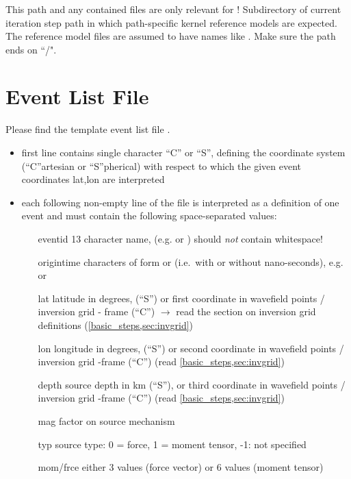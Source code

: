 \subsubsection{} 
This path and any contained files are only relevant for !
Subdirectory of current iteration step path
 in which path-specific kernel reference models are expected.
The reference model files are assumed to have names like .
Make sure the path ends on ``/".

%
\section{Event List File} \label{files,sec:event_list}
%
Please find the template event list file .

\begin{itemize}
\item first line contains single character ``C'' or ``S'', defining the coordinate system (``C''artesian or ``S''pherical)
  with respect to which the given event coordinates lat,lon are interpreted
\item each following non-empty line of the file is interpreted as a definition of one event and must 
  contain the following space-separated values:
  \begin{itemize}
  \item[eventid]  13 character name, (e.g.  or ) 
    should \emph{not} contain whitespace!
  \item[origintime]  characters of form  or 
    (i.e.\ with or without nano-seconds), e.g.  or 
  \item[lat] latitude in degrees,  (``S'') or first coordinate in 
    wavefield points / inversion grid - frame (``C'') $\rightarrow$  read the section on inversion grid definitions 
    (\ref{basic_steps,sec:invgrid})
  \item[lon] longitude in degrees,  (``S'') or second  coordinate in 
    wavefield points / inversion grid -frame (``C'') (read \ref{basic_steps,sec:invgrid})
  \item[depth] source depth in km (``S''), or third coordinate in wavefield points / inversion grid -frame (``C'') 
    (read \ref{basic_steps,sec:invgrid})
  \item[mag] factor on source mechanism
  \item[typ] source type:  0 = force, 1 = moment tensor, -1: not specified
  \item[mom/frce] either 3 values (force vector) or 6 values (moment tensor)
  \end{itemize}
\end{itemize}
%
